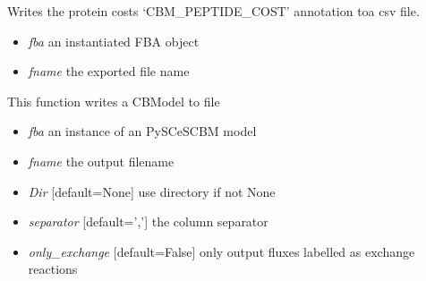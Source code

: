 \documentclass[a4paper,11pt,english]{sphinxmanual}
\begin{document}
\begin{fulllineitems}
\label{modules_doc:cbmpy.CBWrite.writeProteinCostToCSV}
Writes the protein costs `CBM\_PEPTIDE\_COST' annotation toa csv file.
\begin{itemize}
\item {} 
\emph{fba} an instantiated FBA object

\item {} 
\emph{fname} the exported file name

\end{itemize}

\end{fulllineitems}


\begin{fulllineitems}
\label{modules_doc:cbmpy.CBWrite.writeReactionInfoToFile}
This function writes a CBModel to file
\begin{itemize}
\item {} 
\emph{fba} an instance of an PySCeSCBM model

\item {} 
\emph{fname} the output filename

\item {} 
\emph{Dir} {[}default=None{]} use directory if not None

\item {} 
\emph{separator} {[}default=','{]} the column separator

\item {} 
\emph{only\_exchange} {[}default=False{]} only output fluxes labelled as exchange reactions

\end{itemize}

\end{fulllineitems}

\end{document}
